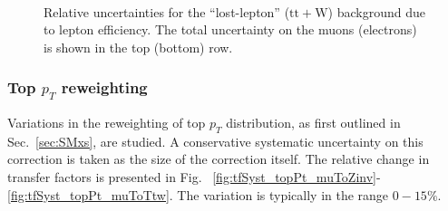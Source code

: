 \begin{figure}[!h]
{  } ~~
  \\
  \caption{\label{fig:lostLepton} 
    Relative uncertainties for the ``lost-lepton'' ($\mathrm{tt+W}$) background due to lepton efficiency. 
    The total uncertainty on the muons (electrons) is shown in the top (bottom) row.
  }
  
\end{figure}



\subsubsection*{Top $p_T$ reweighting}
\label{sec:tfSyst_topPt}

Variations in the reweighting of top $p_{T}$ distribution, as first outlined in 
Sec.~\ref{sec:SMxs}, are studied. A conservative systematic
uncertainty on this correction is taken as the size of the correction itself. 
The relative change in transfer factors is presented in Fig.
~\ref{fig:tfSyst_topPt_muToZinv}-\ref{fig:tfSyst_topPt_muToTtw}. The
variation is typically in the range $0-15\%$.

